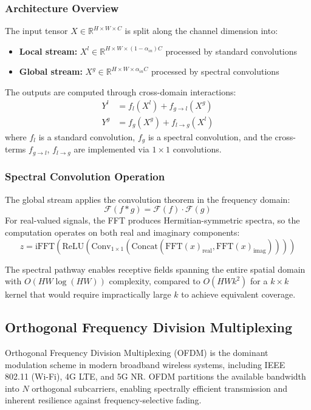 \documentclass[a4paper]{article}
\theoremstyle{definition}
\begin{document}
\subsubsection{Architecture Overview}

The input tensor $X \in \mathbb{R}^{H \times W \times C}$ is split along the channel dimension into:
\begin{itemize}
    \item \textbf{Local stream:} $X^l \in \mathbb{R}^{H \times W \times (1-\alpha_{in})C}$ processed by standard convolutions
    \item \textbf{Global stream:} $X^g \in \mathbb{R}^{H \times W \times \alpha_{in}C}$ processed by spectral convolutions
\end{itemize}

The outputs are computed through cross-domain interactions:
\begin{align*}
Y^l &= f_l(X^l) + f_{g\to l}(X^g) \\
Y^g &= f_g(X^g) + f_{l\to g}(X^l)
\end{align*}
where $f_l$ is a standard convolution, $f_g$ is a spectral convolution, and the cross-terms $f_{g\to l}$, $f_{l\to g}$ are implemented via $1\times 1$ convolutions.

\subsubsection{Spectral Convolution Operation}

The global stream applies the convolution theorem in the frequency domain:
\[
\mathcal{F}(f * g) = \mathcal{F}(f) \cdot \mathcal{F}(g)
\]
For real-valued signals, the FFT produces Hermitian-symmetric spectra, so the computation operates on both real and imaginary components:
\[
z = \text{iFFT}\left(\text{ReLU}\left(\text{Conv}_{1\times 1}\left(\text{Concat}(\text{FFT}(x)_{\text{real}}, \text{FFT}(x)_{\text{imag}})\right)\right)\right)
\]

The spectral pathway enables receptive fields spanning the entire spatial domain with $O(HW \log(HW))$ complexity, compared to $O(HWk^2)$ for a $k\times k$ kernel that would require impractically large $k$ to achieve equivalent coverage. 

\subsection{Orthogonal Frequency Division Multiplexing}

Orthogonal Frequency Division Multiplexing (OFDM) is the dominant modulation scheme in modern broadband wireless systems, including IEEE 802.11 (Wi-Fi), 4G LTE, and 5G NR. OFDM partitions the available bandwidth into $N$ orthogonal subcarriers, enabling spectrally efficient transmission and inherent resilience against frequency-selective fading.
\end{document}
